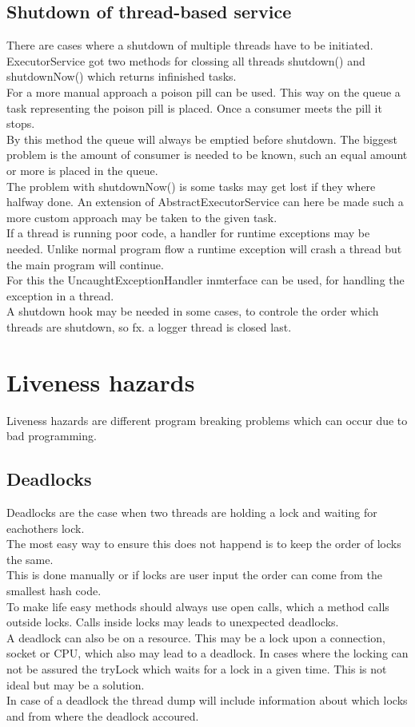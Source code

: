\documentclass[12pt, a4paper]{article}
\begin{document}
		\subsection{Shutdown of thread-based service}
			There are cases where a shutdown of multiple threads have to be initiated.\\
			ExecutorService got two methods for clossing all threads shutdown() and shutdownNow() which returns infinished tasks.\\
			For a more manual approach a poison pill can be used. This way on the queue a task representing the poison pill is placed. Once a consumer meets the pill it stops.\\
			By this method the queue will always be emptied before shutdown. The biggest problem is the amount of consumer is needed to be known, such an equal amount or more is placed in the queue.\\
			The problem with shutdownNow() is some tasks may get lost if they where halfway done. An extension of AbstractExecutorService can here be made such a more custom approach may be taken to the given task.\\
			If a thread is running poor code, a handler for runtime exceptions may be needed. Unlike normal program flow a runtime exception will crash a thread but the main program will continue.\\
			For this the UncaughtExceptionHandler inmterface can be used, for handling the exception in a thread.\\[4mm]
			A shutdown hook may be needed in some cases, to controle the order which threads are shutdown, so fx. a logger thread is closed last.\\

	\section{Liveness hazards}
		Liveness hazards are different program breaking problems which can occur due to bad programming.
		\subsection{Deadlocks}
			Deadlocks are the case when two threads are holding a lock and waiting for eachothers lock.\\
			The most easy way to ensure this does not happend is to keep the order of locks the same.\\
			This is done manually or if locks are user input the order can come from the smallest hash code.\\
			To make life easy methods should always use open calls, which a method calls outside locks. Calls inside locks may leads to unexpected deadlocks.\\
			A deadlock can also be on a resource. This may be a lock upon a connection, socket or CPU, which also may lead to a deadlock.
			In cases where the locking can not be assured the tryLock which waits for a lock in a given time. This is not ideal but may be a solution.\\
			In case of a deadlock the thread dump will include information about which locks and from where the deadlock accoured.\\
\end{document}
